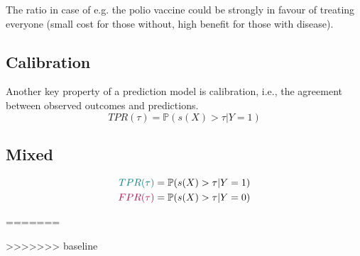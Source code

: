 	The ratio in case of e.g. the polio vaccine could be strongly in favour of treating everyone (small cost for those without, high benefit for those with disease).
	
	
	
\subsection{Calibration}
	Another key property of a prediction model is calibration, i.e., the agreement between observed outcomes and predictions.
	\[
		TPR(\tau) = \mathbb{P}(s(X) > \tau | Y = 1)
	\]


\subsection{Mixed}
	\begin{align*}
    		\color{teal} TPR(\tau) &= \mathbb{P}(s(X) > \tau | Y = 1) \\
    		\color{purple} FPR(\tau) &= \mathbb{P}(s(X) > \tau | Y = 0) \\
    	\end{align*}

	
=======
	




>>>>>>> baseline
